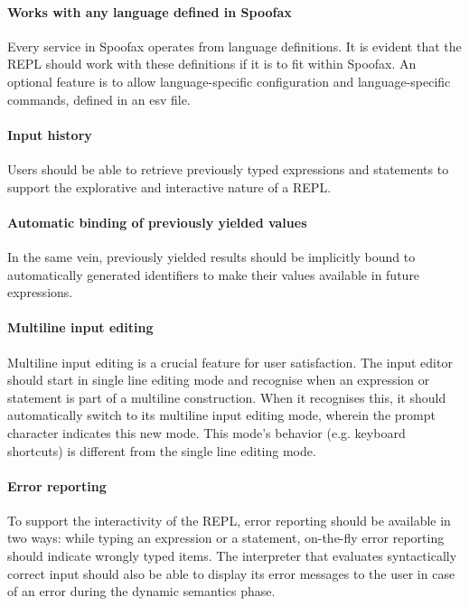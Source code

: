 \paragraph{Works with any language defined in Spoofax} Every service in Spoofax operates
from language definitions. It is evident that the REPL should work with these
definitions if it is to fit within Spoofax. An optional feature is to allow
language-specific configuration and language-specific commands, defined in an esv file.

\paragraph{Input history} Users should be able to retrieve previously
typed expressions and statements to support the explorative and interactive
nature of a REPL.

\paragraph{Automatic binding of previously yielded values} In the same vein,
previously yielded results should be implicitly bound to automatically generated
identifiers to make their values available in future expressions.

\paragraph{Multiline input editing} Multiline input editing is a crucial feature
for user satisfaction. The input editor should start in single line editing mode
and recognise when an expression or statement is part of a multiline
construction. When it recognises this, it should automatically switch to its
multiline input editing mode, wherein the prompt character indicates this new
mode. This mode's behavior (e.g. keyboard shortcuts) is different from the
single line editing mode.

\paragraph{Error reporting} To support the interactivity of the REPL, error
reporting should be available in two ways: while typing an expression or a
statement, on-the-fly error reporting should indicate wrongly typed items. The
interpreter that evaluates syntactically correct input should also be able to
display its error messages to the user in case of an error during the dynamic
semantics phase.

